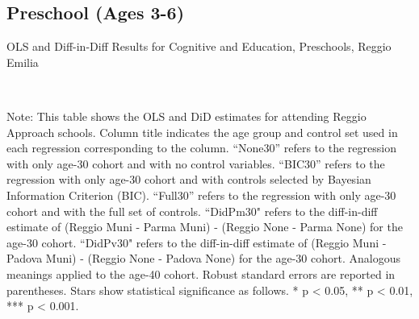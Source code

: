 \begin{landscape}
\subsection{Preschool (Ages 3-6)}

\begin{table}[H] \caption{OLS and Diff-in-Diff Results for Cognitive and Education, Preschools, Reggio Emilia} \label{ols-E-reg}
\scalebox{0.80}{}
\vspace{1ex} \\
\footnotesize\raggedright{Note: This table shows the OLS and DiD estimates for attending Reggio Approach schools. Column title indicates the age group and control set used in each regression corresponding to the column. ``None30'' refers to the regression with only age-30 cohort and with no control variables. ``BIC30'' refers to the regression with only age-30 cohort and with controls selected by Bayesian Information Criterion (BIC). ``Full30'' refers to the regression with only age-30 cohort and with the full set of controls. ``DidPm30" refers to the diff-in-diff estimate of (Reggio Muni - Parma Muni) - (Reggio None - Parma None) for the age-30 cohort. ``DidPv30" refers to the diff-in-diff estimate of (Reggio Muni - Padova Muni) - (Reggio None - Padova None) for the age-30 cohort. Analogous meanings applied to the age-40 cohort. Robust standard errors are reported in parentheses. Stars show statistical significance as follows. * p < 0.05, ** p < 0.01, *** p < 0.001.}
\end{table}



\end{landscape}

